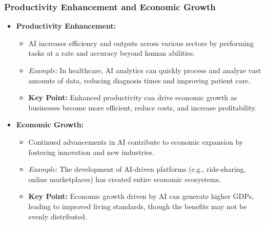 \documentclass[aspectratio=169]{beamer}
\begin{document}
\begin{frame}[fragile]
    \frametitle{Productivity Enhancement and Economic Growth}
    \begin{itemize}
        \item \textbf{Productivity Enhancement:}
            \begin{itemize}
                \item AI increases efficiency and outputs across various sectors by performing tasks at a rate and accuracy beyond human abilities.
                \item \textit{Example:} In healthcare, AI analytics can quickly process and analyze vast amounts of data, reducing diagnosis times and improving patient care.
                \item \textbf{Key Point:} Enhanced productivity can drive economic growth as businesses become more efficient, reduce costs, and increase profitability.
            \end{itemize}
        \item \textbf{Economic Growth:}
            \begin{itemize}
                \item Continued advancements in AI contribute to economic expansion by fostering innovation and new industries.
                \item \textit{Example:} The development of AI-driven platforms (e.g., ride-sharing, online marketplaces) has created entire economic ecosystems.
                \item \textbf{Key Point:} Economic growth driven by AI can generate higher GDPs, leading to improved living standards, though the benefits may not be evenly distributed.
            \end{itemize}
    \end{itemize}
\end{frame}
\end{document}
